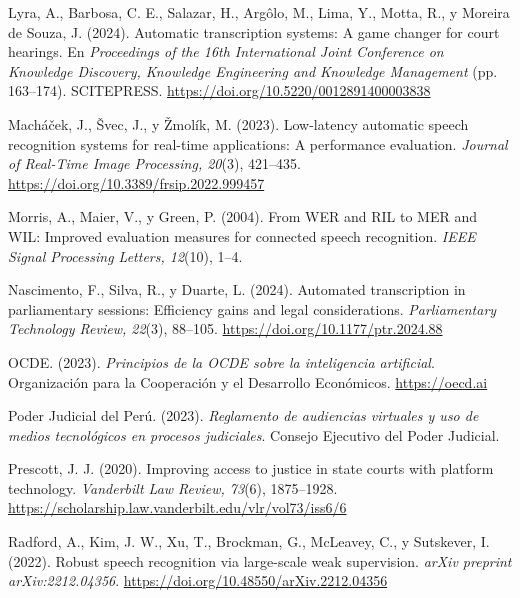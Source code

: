 \documentclass[12pt,a4paper,oneside]{report}
\begin{document}
\vspace{6pt}
Lyra, A., Barbosa, C. E., Salazar, H., Argôlo, M., Lima, Y., Motta, R., y Moreira de Souza, J. (2024). Automatic transcription systems: A game changer for court hearings. En \textit{Proceedings of the 16th International Joint Conference on Knowledge Discovery, Knowledge Engineering and Knowledge Management} (pp. 163--174). SCITEPRESS. \url{https://doi.org/10.5220/0012891400003838}

\vspace{6pt}
Macháček, J., Švec, J., y Žmolík, M. (2023). Low-latency automatic speech recognition systems for real-time applications: A performance evaluation. \textit{Journal of Real-Time Image Processing, 20}(3), 421--435. \url{https://doi.org/10.3389/frsip.2022.999457}

\vspace{6pt}
Morris, A., Maier, V., y Green, P. (2004). From WER and RIL to MER and WIL: Improved evaluation measures for connected speech recognition. \textit{IEEE Signal Processing Letters, 12}(10), 1--4.

\vspace{6pt}
Nascimento, F., Silva, R., y Duarte, L. (2024). Automated transcription in parliamentary sessions: Efficiency gains and legal considerations. \textit{Parliamentary Technology Review, 22}(3), 88--105. \url{https://doi.org/10.1177/ptr.2024.88}

\vspace{6pt}
OCDE. (2023). \textit{Principios de la OCDE sobre la inteligencia artificial}. Organización para la Cooperación y el Desarrollo Económicos. \url{https://oecd.ai}

\vspace{6pt}
Poder Judicial del Perú. (2023). \textit{Reglamento de audiencias virtuales y uso de medios tecnológicos en procesos judiciales}. Consejo Ejecutivo del Poder Judicial.

\vspace{6pt}
Prescott, J. J. (2020). Improving access to justice in state courts with platform technology. \textit{Vanderbilt Law Review, 73}(6), 1875--1928. \url{https://scholarship.law.vanderbilt.edu/vlr/vol73/iss6/6}

\vspace{6pt}
Radford, A., Kim, J. W., Xu, T., Brockman, G., McLeavey, C., y Sutskever, I. (2022). Robust speech recognition via large-scale weak supervision. \textit{arXiv preprint arXiv:2212.04356}. \url{https://doi.org/10.48550/arXiv.2212.04356}
\end{document}
